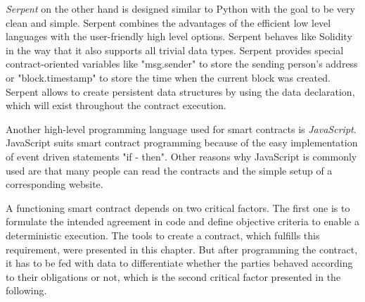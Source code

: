 \documentclass[conference]{IEEEtran}
\begin{document}
\textit{Serpent} on the other hand is designed similar to Python with the goal to be very clean and simple. Serpent combines the advantages of the efficient low level languages with the user-friendly high level options. Serpent behaves like Solidity in the way that it also supports all trivial data types. Serpent provides special contract-oriented variables like "msg.sender" to store the sending person's address or "block.timestamp" to store the time when the current block was created. Serpent allows to create persistent data structures by using the data declaration, which will exist throughout the contract execution. \cite{McAdams2017} \cite{Arnett2015} \par 
Another high-level programming language used for smart contracts is \textit{JavaScript}. JavaScript suits smart contract programming because of the easy implementation of event driven statements "if - then". Other reasons why JavaScript is commonly used are that many people can read the contracts and the simple setup of a corresponding website. \cite{bitquant2016} \par 
A functioning smart contract depends on two critical factors. The first one is to formulate the intended agreement in code and define objective criteria to enable a deterministic execution. The tools to create a contract, which fulfills this requirement, were presented in this chapter. But after programming the contract, it has to be fed with data to differentiate whether the parties behaved according to their obligations or not, which is the second critical factor presented in the following. 
\end{document}
